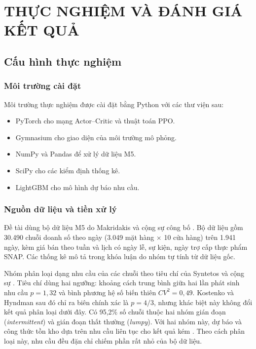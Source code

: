 \chapter{THỰC NGHIỆM VÀ ĐÁNH GIÁ KẾT QUẢ}
\label{chap:chapter4}

\section{Cấu hình thực nghiệm}
\label{sec:cauHinh}

\subsection{Môi trường cài đặt}
\label{subsec:phanCung}

Môi trường thực nghiệm được cài đặt bằng Python với các thư viện sau:
\begin{itemize}
    \item PyTorch cho mạng Actor--Critic và thuật toán PPO.
    \item Gymnasium \parencite{towers2024gymnasium} cho giao diện của môi trường mô phỏng.
    \item NumPy và Pandas để xử lý dữ liệu M5.
    \item SciPy cho các kiểm định thống kê.
    \item LightGBM cho mô hình dự báo nhu cầu.
\end{itemize}

\subsection{Nguồn dữ liệu và tiền xử lý}
\label{subsec:duLieu}

Đề tài dùng bộ dữ liệu M5 do Makridakis và cộng sự công bố \parencite{makridakis2022background, m5dataset}. Bộ dữ liệu gồm 30.490 chuỗi doanh số theo ngày (3.049 mặt hàng $\times$ 10 cửa hàng) trên 1.941 ngày, kèm giá bán theo tuần và lịch có ngày lễ, sự kiện, ngày trợ cấp thực phẩm SNAP. Các thống kê mô tả trong khóa luận do nhóm tự tính từ dữ liệu gốc.

Nhóm phân loại dạng nhu cầu của các chuỗi theo tiêu chí của Syntetos và cộng sự \cite{syntetos2005categorization}. Tiêu chí dùng hai ngưỡng: khoảng cách trung bình giữa hai lần phát sinh nhu cầu $p = 1{,}32$ và bình phương hệ số biến thiên $CV^2 = 0{,}49$. Kostenko và Hyndman \cite{kostenko2006} sau đó chỉ ra biên chính xác là $p = 4/3$, nhưng khác biệt này không đổi kết quả phân loại dưới đây. Có 95,2\% số chuỗi thuộc hai nhóm gián đoạn (\textit{intermittent}) và gián đoạn thất thường (\textit{lumpy}). Với hai nhóm này, dự báo và công thức tồn kho dựa trên nhu cầu liên tục cho kết quả kém \parencite{croston1972, syntetos2005accuracy}. Theo cách phân loại này, nhu cầu đều đặn chỉ chiếm phần rất nhỏ của bộ dữ liệu.

